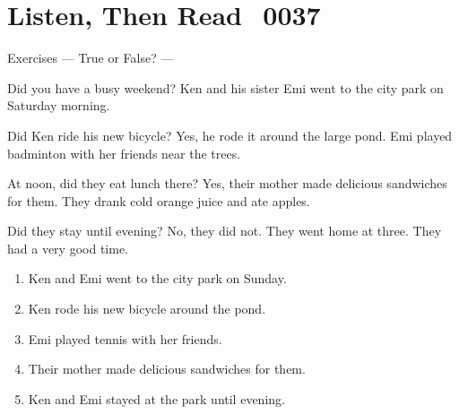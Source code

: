 \documentclass[aspectratio=169,xcolor={dvipsnames,table}]{beamer}
\newcommand{\myaudio}[1]{\href{#1}{\faVolumeUp}}
\begin{document}
\section{Listen, Then Read\,\,\,\,\,{\tiny 0037}\,{\scriptsize \myaudio{./audio/027_past_dd_you_reading.mp3}}}
\begin{frame}[plain,t]{Exercises --- True or False? ---}
\vspace*{-6pt}
\begin{tcolorbox}[colframe=ForestGreen,
  colback=NavyBlue!10!white,
  colbacktitle=NavyBlue!40!white,
  coltitle=black, %
before upper={\setlength{\parindent}{1.25em}},
 title={A Weekend in the Park\hfill{\tiny 0037}\quad{\scriptsize \myaudio{./audio/027_past_did_you_reading.mp3}}}
]
\noindent{}Did you have a busy weekend? Ken and his sister Emi went to the city park on Saturday morning.

Did Ken ride his new bicycle? Yes, he rode it around the large pond. Emi played badminton with her friends near the trees.

At noon, did they eat lunch there? Yes, their mother made delicious sandwiches for them. They drank cold orange juice and ate apples.

Did they stay until evening? No, they did not. They went home at three. They had a very good time.
\end{tcolorbox}

\vspace{-5pt}
\begin{enumerate}\setlength{\itemsep}{-3.35pt}
\item<2-> Ken and Emi went to the city park on Sunday.\hfill{}
\item<2-> Ken rode his new bicycle around the pond.\hfill{}
\item<2-> Emi played tennis with her friends.\hfill{}
\item<2-> Their mother made delicious sandwiches for them.\hfill{}
\item<2-> Ken and Emi stayed at the park until evening.\hfill{}
\end{enumerate}
\end{frame}
\end{document}
